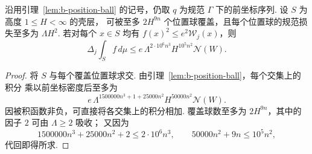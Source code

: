 \begin{lemma}[单个壳层的位置球覆盖]
\label{lem:b-shell-cover}
\emitthmsource
沿用引理~\ref{lem:b-position-ball} 的记号，仍取 $q$ 为规范 $\Gamma$ 下的前坐标序列.
设 $S$ 为高度 $1\le H<\infty$ 的壳层，
可被至多 $2H^{9n}$ 个位置球覆盖，且每个位置球的规范损失至多为 $\Lambda H^2$.
若对每个 $x\in S$ 均有 $f(x)^2\le e^2\mathcal W_j(x)$，则
\[
 \Delta_j\int_S f\,d\mu\le
 e\,\Lambda^{2\cdot10^6n^3}H^{10^5n^2}\mathcal N(W).
\]
\end{lemma}
\begin{proof}
将 $S$ 与每个覆盖位置球求交. 由引理~\ref{lem:b-position-ball}，每个交集上的积分
乘以前坐标密度后至多为
\[
 e\,\Lambda^{1500000n^3+1+25000n^2}H^{50000n^2}\mathcal N(W).
\]
因被积函数非负，可直接将各交集上的积分相加.
覆盖球数至多为 $2H^{9n}$，其中的因子 $2$ 可由 $\Lambda\ge2$ 吸收；
又因为
\[
 1500000n^3+25000n^2+2\le2\cdot10^6n^3,\qquad
 50000n^2+9n\le 10^5n^2,
\]
代回即得所求.
\end{proof}

